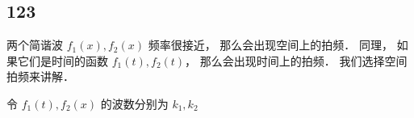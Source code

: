 
\begin{issues}
\issueDraft
\end{issues}


\subsection{123}
两个简谐波 $f_1(x), f_2(x)$ 频率很接近， 那么会出现空间上的拍频． 同理， 如果它们是时间的函数 $f_1(t), f_2(t)$， 那么会出现时间上的拍频． 我们选择空间拍频来讲解．


令 $f_1(t), f_2(x)$ 的波数分别为 $k_1, k_2$
